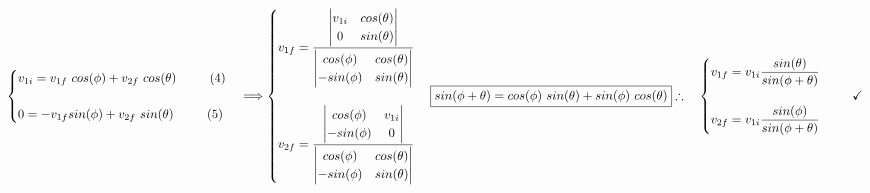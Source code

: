 \documentclass[fleqn]{article}
\begin{document}
 $
    \\
    \begin{cases}
      v_{1i}=v_{1f} ~ cos(\phi)+v_{2f} ~ cos(\theta) ~~~~~~~~ (4)
      \\
      \\
      0=-v_{1f} sin(\phi)+v_{2f} ~ sin(\theta) ~~~~~~~~ (5)
    \end{cases} 
    \Longrightarrow 
    \begin{cases}
      v_{1f}=\dfrac{
        \begin{vmatrix}
          v_{1i} & cos(\theta)
          \\
          0 & sin(\theta)
        \end{vmatrix}
      }{
        \begin{vmatrix}
          cos(\phi) & cos(\theta)
          \\
          -sin(\phi) & sin(\theta)
        \end{vmatrix}
      }
      \\
      \\
      v_{2f}=\dfrac{
        \begin{vmatrix}
          cos(\phi) & v_{1i}
          \\
          -sin(\phi) & 0
        \end{vmatrix}
      }{
        \begin{vmatrix}
          cos(\phi) & cos(\theta)
          \\
          -sin(\phi) & sin(\theta)
        \end{vmatrix}
      }
    \end{cases}
    \\
    \\
    \\
    \boxed{sin(\phi+\theta)=cos(\phi) ~ sin(\theta)+sin(\phi) ~ cos(\theta)}
    \\
    \\
    \\
    \therefore ~~~ \begin{cases}
      v_{1f}=v_{1i} \dfrac{sin(\theta)}{sin(\phi+\theta)}
      \\
      \\
      v_{2f}=v_{1i} \dfrac{sin(\phi)}{sin(\phi+\theta)}
    \end{cases} ~~~~ \checkmark
    \\
    \\
 $

 \vspace{20px}
\end{document}
